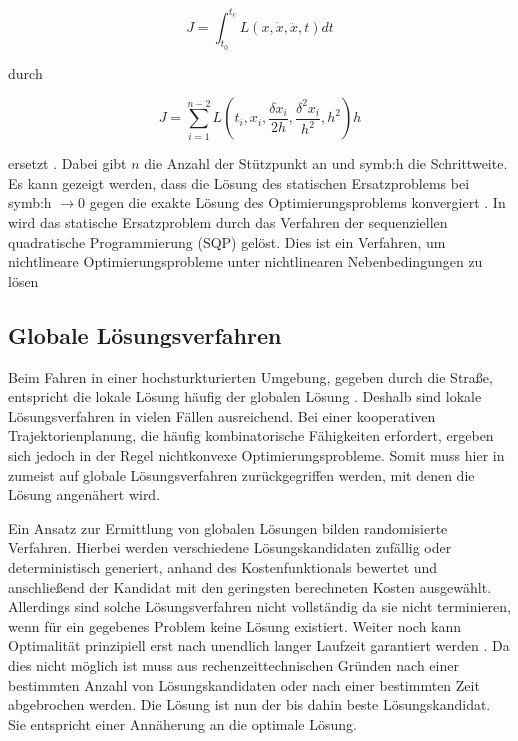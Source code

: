 \begin{equation} 
  J = \int_{t_0}^{t_e} L( x, \dot{x}, \ddot{x} , t) dt
\end{equation} 

durch

\begin{equation} 
  J = \sum_{i=1}^{n-2} L( t_i, x_i, \frac{\delta x_i}{2h}, \frac{\delta^2 x_i}{h^2} , h^2)h
\end{equation} 

ersetzt . Dabei gibt \(n\) die Anzahl der St\"utzpunkt an und \gls{symb:h} die Schrittweite.  \cite{Ziegler2017}
Es kann gezeigt werden, dass die L\"osung des statischen Ersatzproblems bei  \gls{symb:h} \(\to 0\) gegen die exakte L\"osung des Optimierungsproblems konvergiert \cite{Papageorgiou1991}.
In \cite{Ziegler2017} wird das statische Ersatzproblem durch das Verfahren der sequenziellen quadratische Programmierung (SQP) gel\"ost.
Dies ist ein Verfahren, um nichtlineare Optimierungsprobleme unter nichtlinearen Nebenbedingungen zu l\"osen


\subsection{Globale L\"osungsverfahren}
\label{globaleLV}
Beim Fahren in einer hochsturkturierten Umgebung, gegeben durch die Stra{\ss}e, entspricht die lokale L\"osung h\"aufig der globalen L\"osung \cite{Ziegler2017}.
Deshalb sind lokale L\"osungsverfahren in vielen F\"allen ausreichend.
Bei einer kooperativen Trajektorienplanung, die h\"aufig kombinatorische F\"ahigkeiten erfordert, ergeben sich jedoch in der Regel nichtkonvexe Optimierungsprobleme.
Somit muss hier in zumeist auf globale L\"osungsverfahren zur\"uckgegriffen werden, mit denen die L\"osung angen\"ahert wird.

Ein Ansatz zur Ermittlung von globalen L\"osungen bilden randomisierte Verfahren. 
Hierbei werden verschiedene L\"osungskandidaten zuf\"allig oder deterministisch generiert, anhand des Kostenfunktionals bewertet und anschlie{\ss}end der Kandidat mit den geringsten berechneten Kosten ausgew\"ahlt.
Allerdings sind solche L\"osungsverfahren nicht vollst\"andig da sie nicht terminieren, wenn f\"ur ein gegebenes Problem keine L\"osung existiert.
Weiter noch kann Optimalit\"at prinzipiell erst nach unendlich langer Laufzeit garantiert werden \cite{Ziegler2017}.
Da dies nicht m\"oglich ist muss aus rechenzeittechnischen Gr\"unden nach einer bestimmten Anzahl von L\"osungskandidaten oder nach einer bestimmten Zeit abgebrochen werden.
Die L\"osung ist nun der bis dahin beste L\"osungskandidat.
Sie entspricht einer Ann\"aherung an die optimale L\"osung.

